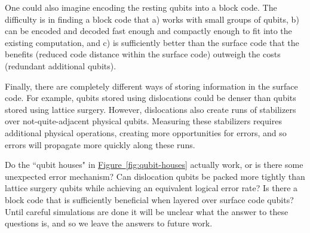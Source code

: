 \documentclass[superscriptaddress,notitlepage,longbibliography]{revtex4-1}
\theoremstyle{definition}
\theoremstyle{definition}
\newcommand{\fig}[1]{\hyperref[fig:#1]{Figure~\ref*{fig:#1}}}
\begin{document}
One could also imagine encoding the resting qubits into a block code.
The difficulty is in finding a block code that a) works with small groups of qubits, b) can be encoded and decoded fast enough and compactly enough to fit into the existing computation, and c) is sufficiently better than the surface code that the benefits (reduced code distance within the surface code) outweigh the costs (redundant additional qubits).

Finally, there are completely different ways of storing information in the surface code.
For example, qubits stored using dislocations \cite{hastings2014dislocations} could be denser than qubits stored using lattice surgery.
However, dislocations also create runs of stabilizers over not-quite-adjacent physical qubits.
Measuring these stabilizers requires additional physical operations, creating more opportunities for errors, and so errors will propagate more quickly along these runs.

Do the ``qubit houses" in \fig{qubit-houses} actually work, or is there some unexpected error mechanism?
Can dislocation qubits be packed more tightly than lattice surgery qubits while achieving an equivalent logical error rate?
Is there a block code that is sufficiently beneficial when layered over surface code qubits?
Until careful simulations are done it will be unclear what the answer to these questions is, and so we leave the answers to future work.
\end{document}
